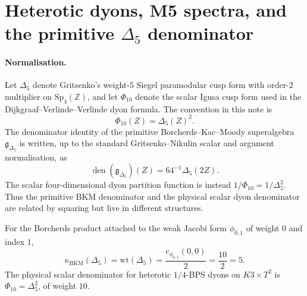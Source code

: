 \providecommand{\kBKM}{\kappa_{\mathrm{BKM}}}
\providecommand{\kch}{\kappa_{\mathrm{ch}}}
\providecommand{\kcat}{\kappa_{\mathrm{cat}}}
\providecommand{\kfib}{\kappa_{\mathrm{fiber}}}
\providecommand{\Z}{\mathbb{Z}}
\providecommand{\C}{\mathbb{C}}
\providecommand{\R}{\mathbb{R}}
\providecommand{\cO}{\mathcal{O}}
\providecommand{\cH}{\mathcal{H}}
\providecommand{\fg}{\mathfrak{g}}
\providecommand{\Sp}{\mathrm{Sp}}
\providecommand{\MSW}{\mathrm{MSW}}
\providecommand{\AdS}{\mathrm{AdS}}
\providecommand{\CoHA}{\mathrm{CoHA}}
\providecommand{\Perf}{\mathrm{Perf}}
\providecommand{\Rep}{\mathrm{Rep}}

\section*{Heterotic dyons, M5 spectra, and the primitive
\texorpdfstring{$\Delta_5$}{Delta5} denominator}
\label{sec:heterotic-BH-witten}

\paragraph{Normalisation.}
Let $\Delta_5$ denote Gritsenko's weight-$5$ Siegel paramodular cusp
form with order-$2$ multiplier on $\Sp_4(\Z)$, and let
$\Phi_{10}$ denote the scalar Igusa cusp form used in the
Dijkgraaf--Verlinde--Verlinde dyon formula. The convention in this note is
\[
 \Phi_{10}(Z)=\Delta_5(Z)^2 .
\]
The denominator identity of the primitive Borcherds--Kac--Moody
superalgebra $\fg_{\Delta_5}$ is written, up to the standard
Gritsenko--Nikulin scalar and argument normalisation, as
\[
 \operatorname{den}(\fg_{\Delta_5})(Z)=64^{-1}\Delta_5(2Z).
\]
The scalar four-dimensional dyon partition function is instead
$1/\Phi_{10}=1/\Delta_5^2$. Thus the primitive BKM denominator and the
physical scalar dyon denominator are related by squaring but live in
different structures.

\begin{theorem}
\label{thm:delta5-phi10-primitive}
For the Borcherds product attached to the weak Jacobi form
$\phi_{0,1}$ of weight $0$ and index $1$,
\[
 \kBKM(\Delta_5)=\mathrm{wt}(\Delta_5)
 =\frac{c_{\phi_{0,1}}(0,0)}{2}
 =\frac{10}{2}=5.
\]
The physical scalar denominator for heterotic $1/4$-BPS dyons on
$K3\times T^2$ is $\Phi_{10}=\Delta_5^2$, of weight $10$.
\end{theorem}


